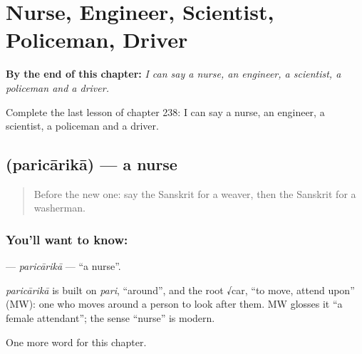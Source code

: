 
\chapter{Nurse, Engineer, Scientist, Policeman, Driver}
\label{ch:sa-nurse-engineer-scientist-policeman-driver}

\begin{chapteropening}
\textbf{By the end of this chapter:} \emph{I can say a nurse, an engineer, a scientist, a policeman and a driver.}

Complete the last lesson of chapter 238: I can say a nurse, an engineer, a scientist, a policeman and a driver.
\end{chapteropening}

\section[\texorpdfstring{\sk{परिचारिका} (paricārikā)}{परिचारिका (paricārikā)}]{ (paricārikā) — a nurse}

\label{lesson:SA-C238-paricarika}



\begin{quote}
Before the new one: say the Sanskrit for a weaver, then the Sanskrit for a washerman.
\end{quote}

\subsection*{You'll want to know: }
\textbf{} — \emph{paricārikā} — \textquotedblleft{}a nurse\textquotedblright{}.

\begin{cousinweb}
\emph{paricārikā} is built on \emph{pari}, \textquotedblleft{}around\textquotedblright{}, and the root √car, \textquotedblleft{}to move, attend upon\textquotedblright{} (MW): one who moves around a person to look after them. MW glosses it \textquotedblleft{}a female attendant\textquotedblright{}; the sense \textquotedblleft{}nurse\textquotedblright{} is modern.
\end{cousinweb}

\begin{grammarlens}[title={What you've built}]
One more word for this chapter.
\end{grammarlens}

